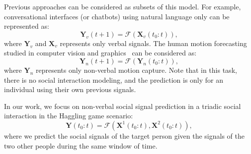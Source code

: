 Previous approaches can be considered as subsets of this model. For example, conversational interfaces (or chatbots) using natural language only can be represented as:
\begin{equation}
\mathbf{Y}_v (t+1) =  \mathcal{F} \left( \mathbf{X}_v (t_0:t) \right),
\end{equation}
where $\mathbf{Y}_v$ and $\mathbf{X}_v$ represents only verbal signals. The human motion forecasting studied in computer vision and graphics~\cite{Fragkiadaki_2015_ICCV, jain2016structural} can be considered as:
\begin{equation}
\mathbf{Y}_n (t+1) =  \mathcal{F} \left( \mathbf{Y}_n (t_0:t) \right),
\end{equation}
where $\mathbf{Y}_n$ represents only non-verbal motion capture. Note that in this task, there is no social interaction modeling, and the prediction is only for an individual using their own previous signals. 

In our work, we focus on non-verbal social signal prediction in a triadic social interaction in the Haggling game scenario:
\begin{equation}
\mathbf{Y} ( t_0:t ) =  \mathcal{F} \left( \mathbf{X}^1 (t_0:t), \mathbf{X}^2 (t_0:t) \right),
\label{equation:F_ours}
\end{equation}
where we predict the social signals of the target person given the signals of the two other people during the same window of time. %
















